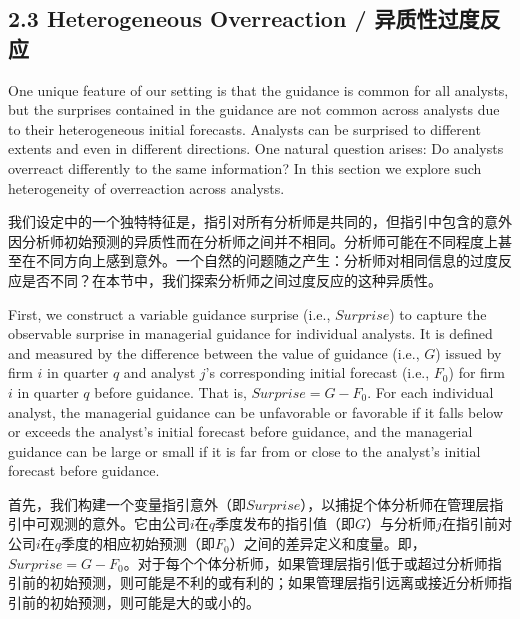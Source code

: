 \documentclass[12pt,a4paper]{article}
\newenvironment{original}
  {\par\medskip\noindent\ignorespaces}
  {\par\medskip}
\newenvironment{translation}
  {\par\noindent{\color{transblue}\ignorespaces}}
  {\par\bigskip}
\begin{document}

\newpage
\subsection{2.3 Heterogeneous Overreaction / 异质性过度反应}

\begin{original}
One unique feature of our setting is that the guidance is common for all analysts, but the surprises contained in the guidance are not common across analysts due to their heterogeneous initial forecasts. Analysts can be surprised to different extents and even in different directions. One natural question arises: Do analysts overreact differently to the same information? In this section we explore such heterogeneity of overreaction across analysts.
\end{original}
\begin{translation}
我们设定中的一个独特特征是，指引对所有分析师是共同的，但指引中包含的意外因分析师初始预测的异质性而在分析师之间并不相同。分析师可能在不同程度上甚至在不同方向上感到意外。一个自然的问题随之产生：分析师对相同信息的过度反应是否不同？在本节中，我们探索分析师之间过度反应的这种异质性。
\end{translation}

\begin{original}
First, we construct a variable guidance surprise (i.e., $Surprise$) to capture the observable surprise in managerial guidance for individual analysts. It is defined and measured by the difference between the value of guidance (i.e., $G$) issued by firm $i$ in quarter $q$ and analyst $j$'s corresponding initial forecast (i.e., $F_0$) for firm $i$ in quarter $q$ before guidance. That is, $Surprise = G - F_0$. For each individual analyst, the managerial guidance can be unfavorable or favorable if it falls below or exceeds the analyst's initial forecast before guidance, and the managerial guidance can be large or small if it is far from or close to the analyst's initial forecast before guidance.
\end{original}
\begin{translation}
首先，我们构建一个变量指引意外（即$Surprise$），以捕捉个体分析师在管理层指引中可观测的意外。它由公司$i$在$q$季度发布的指引值（即$G$）与分析师$j$在指引前对公司$i$在$q$季度的相应初始预测（即$F_0$）之间的差异定义和度量。即，$Surprise = G - F_0$。对于每个个体分析师，如果管理层指引低于或超过分析师指引前的初始预测，则可能是不利的或有利的；如果管理层指引远离或接近分析师指引前的初始预测，则可能是大的或小的。
\end{translation}
\end{document}
